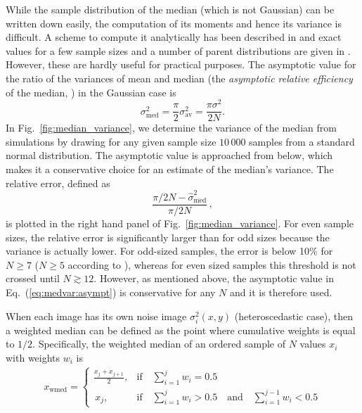 While the sample distribution of the median (which is not Gaussian)
can be written down easily, the computation of its moments and hence
its variance is difficult. A scheme to compute it analytically has
been described in \cite{Maritz-Jarrett1978} and exact values for a few
sample sizes and a number of parent distributions are given in
\cite{Rider1960}. However, these are hardly useful for practical
purposes. The asymptotic value for the ratio of the variances of mean
and median (the \textit{asymptotic relative efficiency} of the median,
\cite{DasGupta2008}) in the Gaussian case is
\begin{equation}
  \label{eq:medvar:asympt}
  \sigma^{2}_{\mathrm{med}} = \frac{\pi}{2}\sigma_{\mathrm{av}}^{2} =
  \frac{\pi\sigma^{2}}{2N}. 
\end{equation}
In Fig.~\ref{fig:median_variance}, we determine the variance of the
median from simulations by drawing for any given sample size $10\,000$
samples from a standard normal distribution. The asymptotic value is
approached from below, which makes it a conservative choice for an
estimate of the median's variance. The relative error, defined as
\begin{equation}
  \label{eq:medvar:asympt:error}
  \frac{\pi/2N - \hat\sigma^{2}_{\mathrm{med}}}{\pi/2N}\,,
\end{equation}
is plotted in the right hand panel of Fig.~\ref{fig:median_variance}. 
For even sample sizes, the relative error is significantly larger than
for odd sizes because the variance is actually lower. For odd-sized
samples, the error is below 10\% for $N\geq7$ ($N\geq 5$
according to \cite{Rider1960}), whereas for even sized samples this
threshold is not crossed until $N\gtrsim 12$. However, as mentioned
above, the asymptotic value in Eq.~(\ref{eq:medvar:asympt}) is
conservative for any $N$ and it is therefore used. 

When each image has its own noise image $\sigma_{i}^{2}(x,y)$
(heteroscedastic case), then a weighted median can be defined as the
point where cumulative weights is equal to $1/2$. Specifically, the
weighted median of an ordered sample of $N$ values $x_{i}$ with
weights $w_{i}$ is 
\begin{align}
  \label{eq:weighted_median}
  x_{\mathrm{wmed}} =
  \begin{cases}
    \displaystyle\frac{x_{j} + x_{j+1}}{2},  &\text{if}\quad
    \sum_{i=1}^{j} w_{i} = 0.5 \\
    \,x_{j},&\text{if}\quad \sum_{i=1}^{j} w_{i} >
    0.5 \quad\text{and}\quad \sum_{i=1}^{j-1} w_{i}< 0.5 
  \end{cases}
\end{align}



